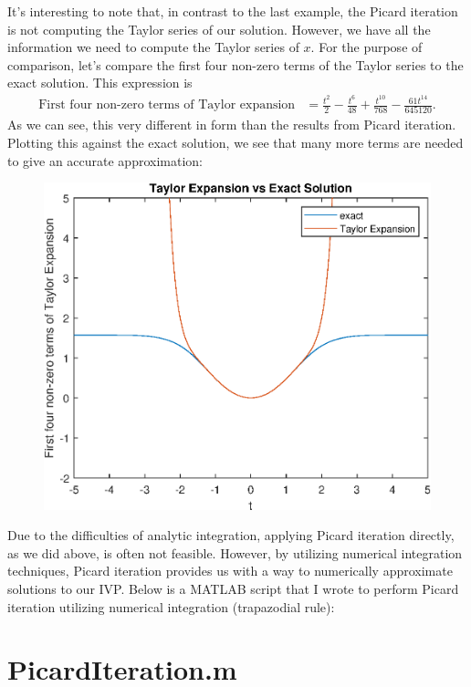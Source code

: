 \documentclass[10pt,a4paper]{article}
\theoremstyle{theorem}
\theoremstyle{definition}
\begin{document}
It's interesting to note that, in contrast to the last example, the Picard iteration is not computing the Taylor series of our solution.  However, we have all the information we need to compute the Taylor series of $x$. For the purpose of comparison, let's compare the first four non-zero terms of the Taylor series to the exact solution. This expression is
\begin{align*}
\text{First four non-zero terms of Taylor expansion} &= \frac{t^2}{2} - \frac{t^6}{48} + \frac{t^{10}}{768} - \frac{61 t^{14}}{645120}.
\end{align*}
As we can see, this very different in form than the results from Picard iteration. Plotting this against the exact solution, we see that many more terms are needed to give an accurate approximation:
\begin{figure}[ht]
    \centering
    \includegraphics[scale=1]{TaylorSeries}
\end{figure}

\pagebreak
Due to the difficulties of analytic integration, applying Picard iteration directly, as we did above, is often not feasible. However, by utilizing numerical integration techniques, Picard iteration provides us with a way to numerically approximate solutions to our IVP. Below is a MATLAB script that I wrote to perform Picard iteration utilizing numerical integration (trapazodial rule): 

\section*{PicardIteration.m}

\end{document}
